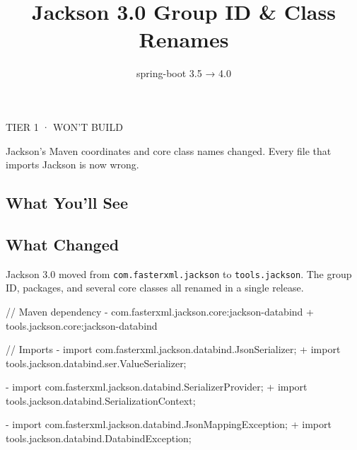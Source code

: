 \documentclass[
  8pt,
  6in, 9inpaper,
]{article}
\title{Jackson 3.0 Group ID \& Class Renames}
\subtitle{spring-boot 3.5 → 4.0}
\author{}
\date{}
\newenvironment{Shaded}{\begin{snugshade}}{\end{snugshade}}
\newcommand{\NormalTok}[1]{\textcolor[rgb]{0.00,0.23,0.31}{#1}}
\begin{document}
\maketitle


TIER 1 · WON'T BUILD

Jackson's Maven coordinates and core class names changed. Every file
that imports Jackson is now wrong.

\subsection{What You'll See}\label{what-youll-see}

\begin{Shaded}
\end{Shaded}

\subsection{What Changed}\label{what-changed}

Jackson 3.0 moved from \texttt{com.fasterxml.jackson} to
\texttt{tools.jackson}. The group ID, packages, and several core classes
all renamed in a single release.

\begin{Shaded}
\begin{Highlighting}[]
\NormalTok{// Maven dependency}
\NormalTok{{-} com.fasterxml.jackson.core:jackson{-}databind}
\NormalTok{+ tools.jackson.core:jackson{-}databind}

\NormalTok{// Imports}
\NormalTok{{-} import com.fasterxml.jackson.databind.JsonSerializer;}
\NormalTok{+ import tools.jackson.databind.ser.ValueSerializer;}

\NormalTok{{-} import com.fasterxml.jackson.databind.SerializerProvider;}
\NormalTok{+ import tools.jackson.databind.SerializationContext;}

\NormalTok{{-} import com.fasterxml.jackson.databind.JsonMappingException;}
\NormalTok{+ import tools.jackson.databind.DatabindException;}
\end{Highlighting}
\end{Shaded}
\end{document}
